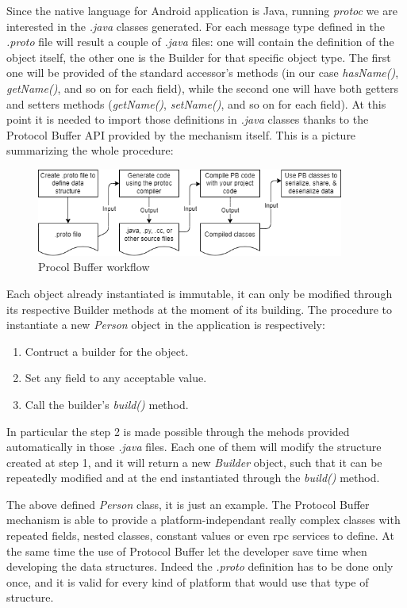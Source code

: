 		\par Since the native language for Android application is Java, running \textit{protoc} we are interested in the \textit{.java} classes generated. For each message type defined in the \textit{.proto} file will result a couple of \textit{.java} files: one will contain the definition of the object itself, the other one is the Builder for that specific object type. The first one will be provided of the standard accessor's methods (in our case \textit{hasName()}, \textit{getName()}, and so on for each field), while the second one will have both getters and setters methods (\textit{getName()}, \textit{setName()}, and so on for each field). At this point it is needed to import those definitions in \textit{.java} classes thanks to the Protocol Buffer API provided by the mechanism itself. This is a picture summarizing the whole procedure:\newline
		\begin{figure}[ht]
				\centering
				\includegraphics[width=0.9\textwidth]{images/protobuffer.png}
				\caption{Procol Buffer workflow \cite{protocol_buffer}}
		\end{figure}
		\par Each object already instantiated is immutable, it can only be modified through its respective Builder methods at the moment of its building. The procedure to instantiate a new \textit{Person} object in the application is respectively: 
		\begin{enumerate}
			\item Contruct a builder for the object. 
			\item Set any field to any acceptable value.
			\item Call the builder's \textit{build()} method.
		\end{enumerate}
		\par In particular the step 2 is made possible through the mehods provided automatically in those \textit{.java} files. Each one of them will modify the structure created at step 1, and it will return a new \textit{Builder} object, such that it can be repeatedly modified and at the end instantiated through the \textit{build()} method. \newline
		\par The above defined \textit{Person} class, it is just an example. The Protocol Buffer mechanism is able to provide a platform-independant really complex classes with repeated fields, nested classes, constant values or even rpc services to define. At the same time the use of Protocol Buffer let the developer save time  when developing the data structures. Indeed the \textit{.proto} definition has to be done only once, and it is valid for every kind of platform that would use that type of structure.

